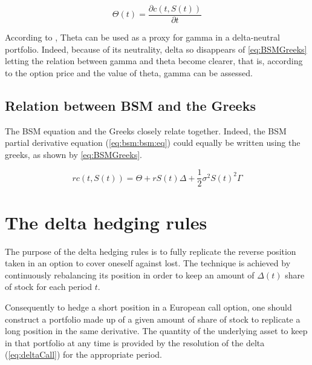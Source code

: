 \documentclass[12pt]{report}
\newcommand{\call}[2]{c\left( #1, #2\right)}
\newcommand{\St}{S\left(t\right)}
\newcommand{\BSMGreeks}[1]{r\call{t}{#1} = \Theta + r #1 \Delta + \frac{1}{2} \sigma ^2 #1 ^2 \Gamma}
\begin{document}
\begin{center}
  \begin{equation}
    \Theta (t) = \frac{\partial \call{t}{\St}}{\partial t}
    \label{eq:ThetaDerivative}
  \end{equation}
\end{center}

According to \citet{hull}, Theta can be used as a proxy for gamma in a delta-neutral portfolio.
Indeed, because of its neutrality, delta so disappears of \cref{eq:BSMGreeks} letting the relation between gamma and theta become clearer, that is, according to the option price and the value of theta, gamma can be assessed.


\subsection{Relation between BSM and the Greeks}
\label{sec:BSMGreeks}

The BSM equation and the Greeks closely relate together.
Indeed, the BSM partial derivative equation (\ref{eq:bsm:bsm:eq}) could equally be written using the greeks, as shown by \cref{eq:BSMGreeks}.

\begin{center}
  \begin{equation}
    \BSMGreeks{\St}
    \label{eq:BSMGreeks}
  \end{equation}
\end{center}



\section{The delta hedging rules}
\label{sec:bsm:delta:hedge}

The purpose of the delta hedging rules is to fully replicate the reverse position taken in an option to cover oneself against lost. The technique is achieved by continuously rebalancing its position in order to keep an amount of $\Delta(t)$ share of stock for each period $t$.

Consequently to hedge a short position in a European call option, one should construct a portfolio made up of a given amount of share of stock to replicate a long position in the same derivative.
The quantity of the underlying asset to keep in that portfolio at any time is provided by the resolution of the delta (\ref{eq:deltaCall}) for the appropriate period.
\end{document}
